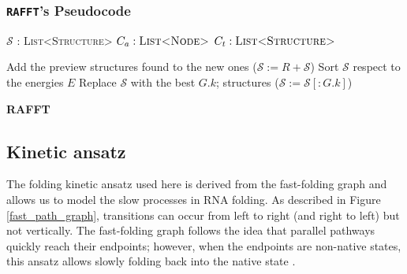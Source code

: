 \subsubsection{\texttt{RAFFT}'s Pseudocode }
\begin{algorithm}[H]
	
	$\mathcal{S}$ : \textsc{List<Structure>}\;
	$C_a : \textsc{List<Node>}$\;
	$C_t : \textsc{List<Structure>} $\;
	
	
	Add the preview structures found to the new ones ($\mathcal{S}:= R+ \mathcal{S}$) \;
	Sort $\mathcal{S}$ respect to the energies $E$\;
	Replace $\mathcal{S}$ with the best $G.k$; structures ($\mathcal{S} := \mathcal{S}[:G.k]$)\; 

	\caption{\textbf{RAFFT} }
\end{algorithm}

\subsection{Kinetic ansatz}
The folding kinetic ansatz used here is derived from the fast-folding graph and allows us to model the slow processes in RNA folding. As described in Figure \ref{fast_path_graph}, transitions can occur from left to right (and right to left) but not vertically. The fast-folding graph follows the idea that parallel pathways quickly reach their endpoints; however, when the endpoints are non-native states, this ansatz allows slowly folding back into the native state \cite{pan97_foldin_rna_invol_paral_pathw}. 

